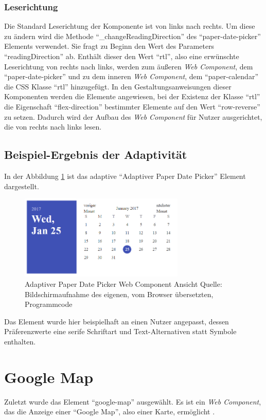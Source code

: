 \documentclass[12pt, paper=a4, bibtotoc, toc=listof, headsepline=true, numbers=endperiod]{scrreprt}
\begin{document}
		\subsubsection{Leserichtung}
		Die Standard Leserichtung der Komponente ist von links nach rechts. Um diese zu ändern wird die Methode \enquote{\_changeReadingDirection} des \enquote{paper-date-picker} Elements verwendet. Sie fragt zu Beginn den Wert des Parameters \enquote{readingDirection} ab. Enthält dieser den Wert \enquote{rtl}, also eine erwünschte Leserichtung von rechts nach links, werden zum äußeren \emph{Web Component}, dem \enquote{paper-date-picker} und zu dem inneren \emph{Web Component}, dem \enquote{paper-calendar} die \ac{CSS} Klasse \enquote{rtl} hinzugefügt. In den Gestaltungsanweisungen dieser Komponenten werden die Elemente angewiesen, bei der Existenz der Klasse \enquote{rtl} die Eigenschaft \enquote{flex-direction} bestimmter Elemente auf den Wert \enquote{row-reverse} zu setzen. Dadurch wird der Aufbau des \emph{Web Component} für Nutzer ausgerichtet, die von rechts nach links lesen.
	\subsection{Beispiel-Ergebnis der Adaptivität}
	In der Abbildung \ref{img:datPicErg} ist das adaptive \enquote{Adaptiver Paper Date Picker} Element  dargestellt.
	\begin{figure}[H]		
		\centering
		\includegraphics[width=0.7\textwidth,height=\textheight,keepaspectratio]{datPicErg.png}
		\caption[Adaptiver Paper Date Picker]{Adaptiver Paper Date Picker Web Component Ansicht Quelle: Bildschirmaufnahme des eigenen, vom Browser übersetzten, Programmcode}
		\label{img:datPicErg}
	\end{figure}\noindent
	Das Element wurde hier beispielhaft an einen Nutzer angepasst, dessen Präferenzwerte eine serife Schriftart und Text-Alternativen statt Symbole enthalten. 
	\newpage
	
	\section{Google Map}
	Zuletzt wurde das Element \enquote{google-map} ausgewählt. Es ist ein \emph{Web Component}, das die Anzeige einer \enquote{Google Map}, also einer Karte, ermöglicht \cite{gooMap}.
\end{document}
